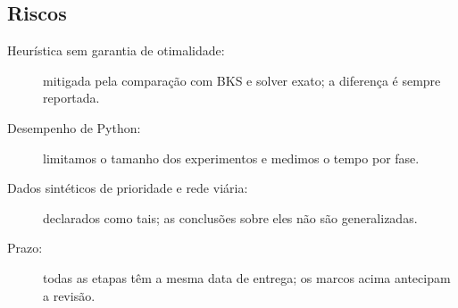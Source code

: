 \documentclass[12pt]{article}
\begin{document}
\subsection{Riscos}

\begin{description}
  \item[Heurística sem garantia de otimalidade:] mitigada pela comparação com BKS e solver exato; a diferença é sempre reportada.
  \item[Desempenho de Python:] limitamos o tamanho dos experimentos e medimos o tempo por fase.
  \item[Dados sintéticos de prioridade e rede viária:] declarados como tais; as conclusões sobre eles não são generalizadas.
  \item[Prazo:] todas as etapas têm a mesma data de entrega; os marcos acima antecipam a revisão.
\end{description}



\end{document}
